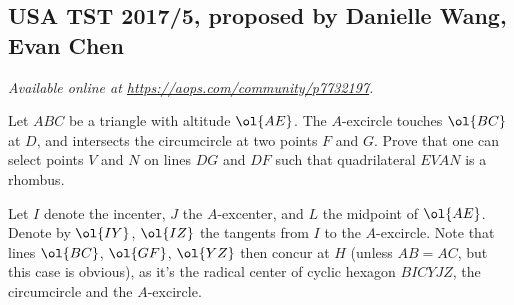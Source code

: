 \documentclass[11pt]{scrartcl}
\begin{document}
\subsection{USA TST 2017/5, proposed by Danielle Wang, Evan Chen}
\textsl{Available online at \url{https://aops.com/community/p7732197}.}
\begin{mdframed}[style=mdpurplebox,frametitle={Problem statement}]
Let $ABC$ be a triangle with altitude $\ol{AE}$.
The $A$-excircle touches $\ol{BC}$ at $D$,
and intersects the circumcircle at two points $F$ and $G$.
Prove that one can select points $V$ and $N$
on lines $DG$ and $DF$ such that quadrilateral $EVAN$ is a rhombus.
\end{mdframed}
Let $I$ denote the incenter, $J$ the $A$-excenter,
and $L$ the midpoint of $\ol{AE}$.
Denote by $\ol{IY}$, $\ol{IZ}$ the tangents
from $I$ to the $A$-excircle.
Note that lines $\ol{BC}$, $\ol{GF}$, $\ol{YZ}$ then concur at $H$
(unless $AB=AC$, but this case is obvious),
as it's the radical center of cyclic hexagon $BICYJZ$,
the circumcircle and the $A$-excircle.
\end{document}

